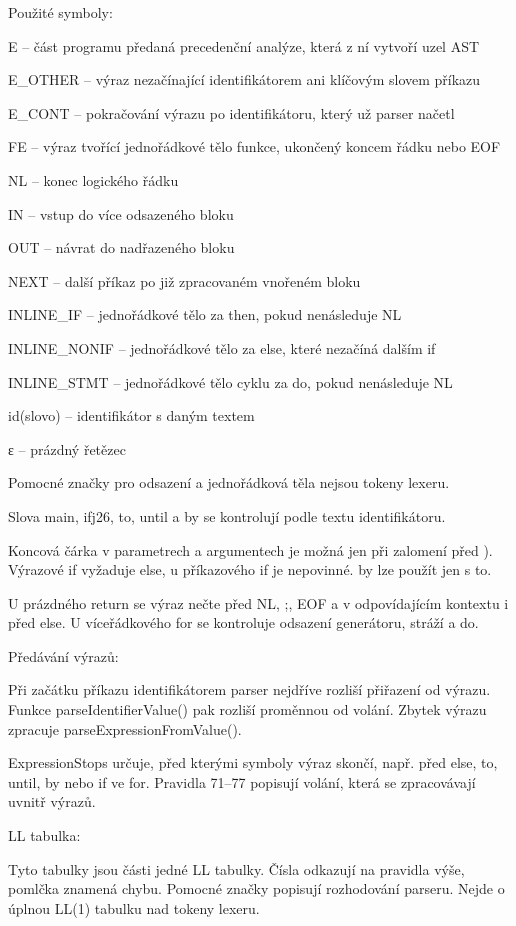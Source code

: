 \documentclass{article}
\begin{document}
Použité symboly:

E -- část programu předaná precedenční analýze, která z ní vytvoří uzel AST

E\_OTHER -- výraz nezačínající identifikátorem ani klíčovým slovem příkazu

E\_CONT -- pokračování výrazu po identifikátoru, který už parser načetl

FE -- výraz tvořící jednořádkové tělo funkce, ukončený koncem řádku nebo EOF

NL -- konec logického řádku

IN -- vstup do více odsazeného bloku

OUT -- návrat do nadřazeného bloku

NEXT -- další příkaz po již zpracovaném vnořeném bloku

INLINE\_IF -- jednořádkové tělo za then, pokud nenásleduje NL

INLINE\_NONIF -- jednořádkové tělo za else, které nezačíná dalším if

INLINE\_STMT -- jednořádkové tělo cyklu za do, pokud nenásleduje NL

id(slovo) -- identifikátor s daným textem

ε -- prázdný řetězec

Pomocné značky pro odsazení a jednořádková těla nejsou tokeny lexeru.

Slova main, ifj26, to, until a by se kontrolují podle textu identifikátoru.

Koncová čárka v parametrech a argumentech je možná jen při zalomení před ). Výrazové if vyžaduje else, u příkazového if je nepovinné. by lze použít jen s to.

U prázdného return se výraz nečte před NL, ;, EOF a v odpovídajícím kontextu i před else. U víceřádkového for se kontroluje odsazení generátoru, stráží a do.

Předávání výrazů:

Při začátku příkazu identifikátorem parser nejdříve rozliší přiřazení od výrazu. Funkce parseIdentifierValue() pak rozliší proměnnou od volání. Zbytek výrazu zpracuje parseExpressionFromValue().

ExpressionStops určuje, před kterými symboly výraz skončí, např. před else, to, until, by nebo if ve for. Pravidla 71--77 popisují volání, která se zpracovávají uvnitř výrazů.
\newpage

LL tabulka:

Tyto tabulky jsou části jedné LL tabulky. Čísla odkazují na pravidla výše, pomlčka znamená chybu. Pomocné značky popisují rozhodování parseru. Nejde o úplnou LL(1) tabulku nad tokeny lexeru.
\end{document}
